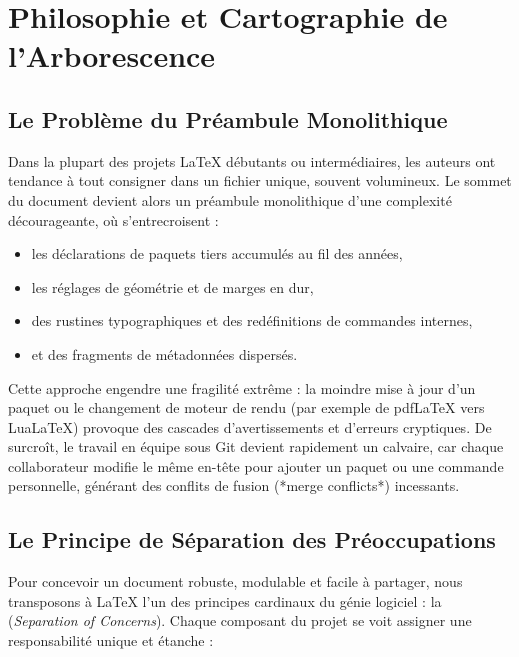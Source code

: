 \chapter{Philosophie et Cartographie de l'Arborescence}
\label{chap:philosophie-arborescence}

\section{Le Problème du Préambule Monolithique}
\label{sec:intro-probleme}

Dans la plupart des projets \LaTeX{} débutants ou intermédiaires,
les auteurs ont tendance à tout consigner dans un fichier unique, souvent volumineux.
Le sommet du document devient alors un préambule monolithique d'une complexité décourageante,
où s'entrecroisent :
\begin{itemize}
  \item les déclarations de paquets tiers accumulés au fil des années,
  \item les réglages de géométrie et de marges en dur,
  \item des rustines typographiques et des redéfinitions de commandes internes,
  \item et des fragments de métadonnées dispersés.
\end{itemize}

Cette approche engendre une fragilité extrême :
la moindre mise à jour d'un paquet ou le changement de moteur de rendu (par exemple de pdf\LaTeX{} vers Lua\LaTeX{})
provoque des cascades d'avertissements et d'erreurs cryptiques.
De surcroît, le travail en équipe sous Git devient rapidement un calvaire,
car chaque collaborateur modifie le même en-tête pour ajouter un paquet ou une commande personnelle,
générant des conflits de fusion (*merge conflicts*) incessants.

\section{Le Principe de Séparation des Préoccupations}
\label{sec:intro-separation}

Pour concevoir un document robuste, modulable et facile à partager,
nous transposons à \LaTeX{} l'un des principes cardinaux du génie logiciel :
la  (\textit{Separation of Concerns}).
Chaque composant du projet se voit assigner une responsabilité unique et étanche :

